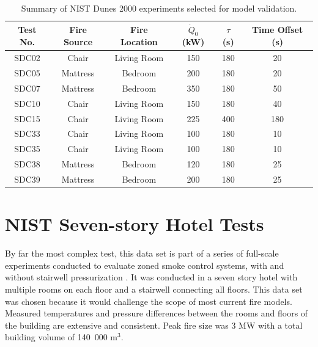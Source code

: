 \begin{table}[h!]
\caption{Summary of NIST Dunes 2000 experiments selected for model validation.}
\begin{center}
\begin{tabular}{|c|c|c|c|c|c|}
\hline
Test No.  &  Fire Source  &  Fire Location  &  $\dot Q_0$ (kW)  &  $\tau$ (s)  &  Time Offset (s)  \\ \hline \hline
SDC02     &  Chair        &  Living Room    &  150              &  180         &  20               \\ \hline
SDC05     &  Mattress     &  Bedroom        &  200              &  180         &  20               \\ \hline
SDC07     &  Mattress     &  Bedroom        &  350              &  180         &  50               \\ \hline
SDC10     &  Chair        &  Living Room    &  150              &  180         &  40               \\ \hline
SDC15     &  Chair        &  Living Room    &  225              &  400         &  180              \\ \hline
SDC33     &  Chair        &  Living Room    &  100              &  180         &  10               \\ \hline
SDC35     &  Chair        &  Living Room    &  100              &  180         &  10               \\ \hline
SDC38     &  Mattress     &  Bedroom        &  120              &  180         &  25               \\ \hline
SDC39     &  Mattress     &  Bedroom        &  200              &  180         &  25               \\ \hline
\end{tabular}
\end{center}
\label{tab:NIST_Dunes_2000_Summary}
\end{table}


\section {NIST Seven-story Hotel Tests}

By far the most complex test, this data set is part of  a series of full-scale experiments conducted to evaluate zoned smoke control systems, with and without stairwell pressurization \cite{Klote:1990}.  It was conducted in a seven story hotel with multiple rooms on each floor and a stairwell connecting all floors.  This data set was chosen because it would challenge the scope of most current fire models.  Measured temperatures and pressure differences between the rooms and floors of the building are extensive and consistent.  Peak fire size was 3 MW with a total building volume of 140~000 m$^3$.

